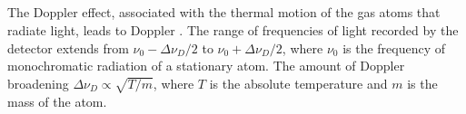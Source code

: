 \subsection{}\label{31.6.4} The Doppler effect, associated with the thermal motion of the gas atoms that radiate light, leads to Doppler . The range of frequencies of light recorded by the detector extends from $\nu_{0} - \Delta \nu_{D}/2$ to $\nu_{0} + \Delta \nu_{D}/2$, where $\nu_{0}$ is the frequency of monochromatic radiation of a stationary atom. The amount of Doppler broadening $\Delta \nu_{D} \propto \sqrt{T/m}$, where $T$ is the absolute temperature and $m$ is the mass of the atom.
